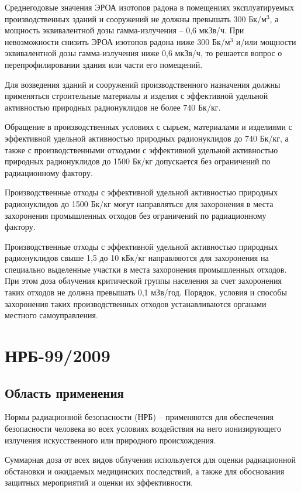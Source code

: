 	Среднегодовые значения ЭРОА изотопов радона в помещениях эксплуатируемых 
	производственных зданий и сооружений не должны превышать 300 Бк/м\(^3\), а 
	мощность эквивалентной дозы гамма-излучения -- 0,6 мкЗв/ч. При 
	невозможности снизить ЭРОА изотопов радона ниже 300 Бк/м\(^3\) и/или мощности 
	эквивалентной дозы гамма-излучения ниже 0,6 мкЗв/ч, то решается вопрос о 
	перепрофилировании здания или части его помещений.
	
	Для возведения зданий и сооружений производственного назначения должны 
	применяться строительные материалы и изделия с эффективной удельной 
	активностью природных радионуклидов не более 740 Бк/кг.
	
	Обращение в производственных условиях с сырьем, материалами и изделиями 
	с эффективной удельной активностью природных радионуклидов до 740 Бк/кг, 
	а также с производственными отходами с эффективной удельной активностью 
	природных радионуклидов до 1500 Бк/кг допускается без ограничений по 
	радиационному фактору.
	
	Производственные отходы с эффективной удельной активностью природных 
	радионуклидов до 1500 Бк/кг могут направляться для захоронения в места 
	захоронения промышленных отходов без ограничений по радиационному фактору.
	
	Производственные отходы с эффективной удельной активностью природных 
	радионуклидов свыше 1,5 до 10 кБк/кг направляются для захоронения на 
	специально выделенные участки в места захоронения промышленных отходов. 
	При этом доза облучения критической группы населения за счет захоронения 
	таких отходов не должна превышать 0,1 мЗв/год. Порядок, условия и способы 
	захоронения таких производственных отходов устанавливаются органами 
	местного самоуправления.

\clearpage

\section{НРБ-99/2009} \label{sect2_1}
\subsection{Область применения} \label{subsect1_2_1}
	Нормы радиационной безопасности (НРБ) -- применяются для обеспечения 
	безопасности человека во всех условиях воздействия на него 
	ионизирующего излучения искусственного или природного происхождения.

	Суммарная доза от всех видов облучения используется для оценки 
	радиационной обстановки и ожидаемых медицинских последствий, а также 
	для обоснования защитных мероприятий и оценки их эффективности.
	
